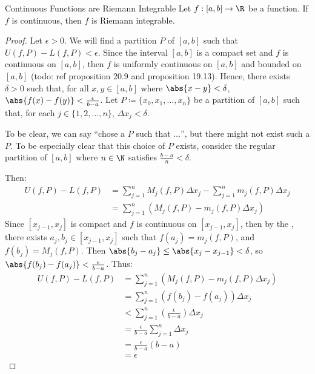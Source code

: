 \begin{thmbox}{Continuous Functions are Riemann Integrable}{}
    Let $f : [a,b] \to \R$ be a function. If $f$ is continuous, then $f$ is Riemann integrable.
    \tcblower
    \begin{proof}
        Let $\epsilon > 0$. We will find a partition $P$ of $[a,b]$ such that $U(f,P) - L(f,P) < \epsilon$. Since the interval $[a,b]$ is a compact set and $f$ is continuous on $[a,b]$, then $f$ is uniformly continuous on $[a,b]$ and bounded on $[a,b]$ (todo: ref proposition 20.9 and proposition 19.13). Hence, there exists $\delta > 0$ such that, for all $x,y \in [a,b]$ where $\abs{x-y} < \delta$, $\abs{f(x) - f(y)} < \frac{\epsilon}{b-a}$. Let $P \coloneq \{x_0, x_1, \ldots, x_n\}$ be a partition of $[a,b]$ such that, for each $j \in \{1, 2, \ldots, n\}$, $\Delta x_j < \delta$.
        \begin{notebox}
            To be clear, we can say ``chose a $P$ such that $\ldots$'', but there might not exist such a $P$. To be especially clear that this choice of $P$ exists, consider the regular partition of $[a,b]$ where $n \in \N$ satisfies $\frac{b-a}{n} < \delta$.
        \end{notebox}
        Then:
        \begin{align*}
            U(f,P) - L(f,P) 
            &= \sum_{j=1}^{n} M_j(f,P) \Delta x_j - \sum_{j=1}^{n} m_j(f,P) \Delta x_j \\
            &= \sum_{j=1}^{n} \left( M_j(f,P) - m_j(f,P) \Delta x_j \right)
        \end{align*}
        Since $[x_{j-1}, x_j]$ is compact and $f$ is continuous on $[x_{j-1}, x_j]$, then by the , there exists $a_j, b_j \in [x_{j-1}, x_j]$ such that $f(a_j) = m_j(f,P)$, and $f(b_j) = M_j(f,P)$. Then $\abs{b_j - a_j} \leq \abs{x_j - x_{j-1}} < \delta$, so $\abs{f(b_j) - f(a_j)} < \frac{\epsilon}{b-a}$. Thus:
        \begin{align*}
            U(f,P) - L(f,P)
            &= \sum_{j=1}^{n} \left( M_j(f,P) - m_j(f,P) \Delta x_j \right) \\
            &= \sum_{j=1}^{n} \left( f(b_j) - f(a_j) \right) \Delta x_j \\
            &< \sum_{j=1}^{n} \left( \frac{\epsilon}{b-a} \right) \Delta x_j \\
            &= \frac{\epsilon}{b-a} \sum_{j=1}^{n} \Delta x_j \\
            &= \frac{\epsilon}{b-a} (b-a) \\
            &= \epsilon
        \end{align*}
    \end{proof}
\end{thmbox}

